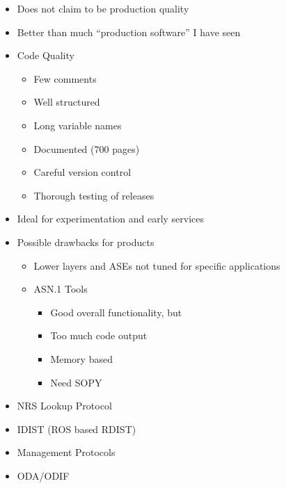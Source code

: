 \begin {bwslide}
\begin {itemize}
\item Does not claim to be production quality
\item Better than much ``production software'' I have seen
\item Code Quality
\begin {itemize}
\item Few comments
\item Well structured
\item Long variable names
\item Documented (700 pages)
\item Careful version control
\item Thorough testing of releases
\end {itemize}

\item Ideal for experimentation and early services

\item Possible drawbacks for products
\begin {itemize}
\item Lower layers and ASEs not tuned for specific applications

\item ASN.1 Tools
\begin {itemize}
\item Good overall functionality, but
\item Too much code output
\item Memory based
\item Need SOPY
\end {itemize}

\end {itemize}


\end {itemize}

\end {bwslide}

\begin {bwslide}
\begin {itemize}
\item NRS Lookup Protocol
\item IDIST (ROS based RDIST)
\item Management Protocols
\item ODA/ODIF
\end {itemize}

\end {bwslide}




